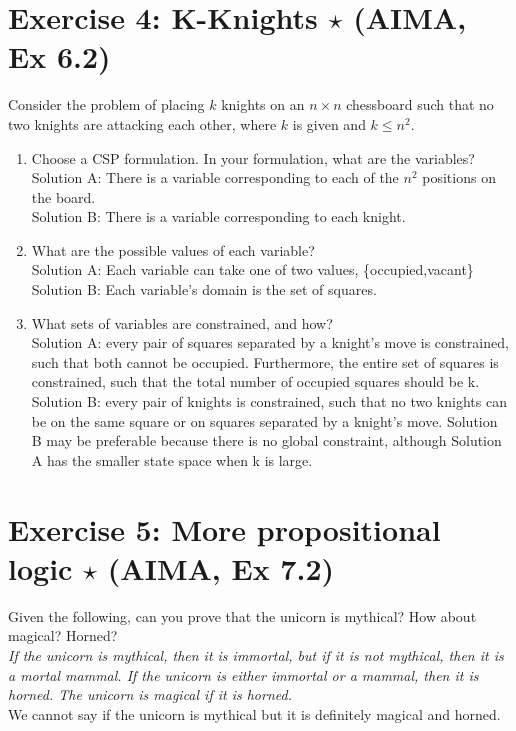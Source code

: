 \documentclass[9pt,a4paper]{extarticle}
\newenvironment{solution}
    {%
    \color{red}
    }
    { 
    \color{black}
    }
\begin{document}
 \section*{Exercise 4: K-Knights $\star$ (AIMA, Ex 6.2)}
 Consider the problem of placing $k$ knights on an $n\times n$ chessboard such that no two knights are attacking each other, where $k$ is given and $k \leq n^2$.
 \begin{enumerate}
     \item Choose a CSP formulation. In your formulation, what are the variables?
     \begin{solution}\\
     Solution A: There is a variable corresponding to each of the $n^2$ positions on the board.\\
    Solution B: There is a variable corresponding to each knight.
     \end{solution}
     \item What are the possible values of each variable?
     \begin{solution}\\
     Solution A: Each variable can take one of two values, \{occupied,vacant\} \\
     Solution B: Each variable’s domain is the set of squares.
     \end{solution}
     \item What sets of variables are constrained, and how?
     \begin{solution}\\
     Solution A: every pair of squares separated by a knight’s move is constrained, such that both cannot be occupied. Furthermore, the entire set of squares is constrained, such that the total number of occupied squares should be k.\\
Solution B: every pair of knights is constrained, such that no two knights can be on the same square or on squares separated by a knight’s move. Solution B may be preferable because there is no global constraint, although Solution A has the smaller state space when k is large.
     \end{solution}
 \end{enumerate}
 \section*{Exercise 5: More propositional logic $\star$ (AIMA, Ex 7.2)}
 Given the following, can you prove that the unicorn is mythical? How about magical? Horned?\\
\textit{If the unicorn is mythical, then it is immortal, but if it is not mythical, then it is a mortal mammal. If the unicorn is either immortal or a mammal, then it is horned. The unicorn is magical if it is horned.}
\begin{solution}\\
We cannot say if the unicorn is mythical but it is definitely magical and horned.
\end{solution}
\end{document}

